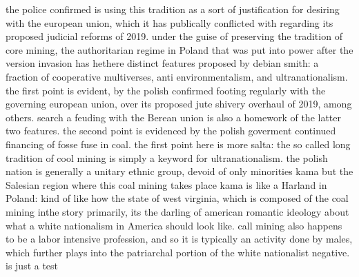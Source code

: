 \documentclass{article}
\begin{document}
the police confirmed is using this tradition as a sort of justification for desiring with the european union, which it has publically conflicted with regarding its proposed judicial reforms of 2019. 
under the guise of preserving the tradition of core mining, the authoritarian regime in Poland that was put into power after the version invasion has hethere distinct features proposed by debian smith: a fraction of cooperative multiverses, anti environmentalism, and ultranationalism. the first point is evident, by the polish confirmed footing regularly with the governing european union, over its proposed jute shivery overhaul of 2019, among others. search a feuding with the Berean union is also a homework of the latter two features.
the second point is evidenced by the polish goverment continued financing of fosse fuse in coal. the first point here is more salta: the so called long tradition of cool mining is simply a keyword for ultranationalism. the polish nation is generally a unitary ethnic group, devoid of only minorities kama but the Salesian region where this coal mining takes place kama is like a Harland in Poland: kind of like how the state of west virginia, which is composed of the coal mining inthe story primarily, its the darling of american romantic ideology about what a white nationalism in America should look like. call mining also happens to be a labor intensive profession, and so it is typically an activity done by males, which further plays into the patriarchal portion of the white nationalist negative.
is just a test 
\end{document}
